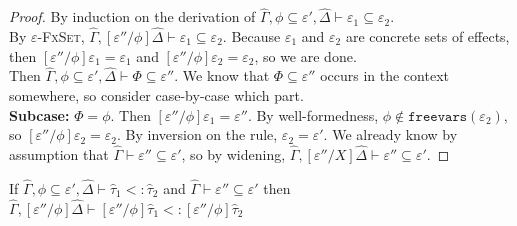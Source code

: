 \documentclass{llncs}
\newcommand{\keywadj}[1]{\mathtt{#1}}
\newcommand{\kwa}[1]{\keywadj{ #1 }}
\begin{document}
\begin{proof}
By induction on the derivation of $\hat \Gamma, \phi \subseteq \varepsilon', \hat \Delta \vdash \varepsilon_1 \subseteq \varepsilon_2$.\\

 By \textsc{$\varepsilon$-FxSet}, $\hat \Gamma, [\varepsilon''/\phi]\hat \Delta \vdash \varepsilon_1 \subseteq \varepsilon_2$. Because $\varepsilon_1$ and $\varepsilon_2$ are concrete sets of effects, then $[\varepsilon''/\phi]\varepsilon_1 = \varepsilon_1$ and $[\varepsilon''/\phi]\varepsilon_2 = \varepsilon_2$, so we are done. \\

 Then $\hat \Gamma, \phi \subseteq \varepsilon', \hat \Delta \vdash \Phi \subseteq \varepsilon''$. We know that $\Phi \subseteq \varepsilon''$ occurs in the context somewhere, so consider case-by-case which part.\\

\textbf{Subcase: } $\Phi = \phi$. Then $[\varepsilon''/\phi]\varepsilon_1 = \varepsilon''$. By well-formedness, $\phi \notin \kwa{freevars}(\varepsilon_2)$, so $[\varepsilon''/\phi]\varepsilon_2 = \varepsilon_2$. By inversion on the rule, $\varepsilon_2 = \varepsilon'$. We already know by assumption that $\hat \Gamma \vdash \varepsilon'' \subseteq \varepsilon'$, so by widening, $\hat \Gamma, [\varepsilon''/X]\hat \Delta \vdash \varepsilon'' \subseteq \varepsilon'$.

\end{proof}

\hrulefill

\begin{lemma}
If $\hat \Gamma, \phi \subseteq \varepsilon', \hat \Delta \vdash \hat \tau_1 <: \hat \tau_2$ and $\hat \Gamma \vdash \varepsilon'' \subseteq \varepsilon'$ then $\hat \Gamma, [\varepsilon''/\phi]\hat \Delta \vdash [\varepsilon''/\phi]\hat \tau_1 <: [\varepsilon''/\phi]\hat \tau_2$
\end{lemma}
\end{document}
